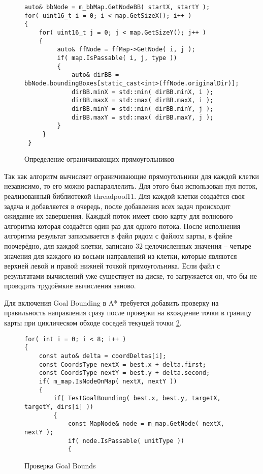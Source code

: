 \begin{figure}[!htb]
	\centering
	\captionsetup{justification=centering}
	\begin{lstlisting}
auto& bbNode = m_bbMap.GetNodeBB( startX, startY );
for( uint16_t i = 0; i < map.GetSizeX(); i++ )
{
	for( uint16_t j = 0; j < map.GetSizeY(); j++ )
	{
		 auto& ffNode = ffMap->GetNode( i, j ); 
		 if( map.IsPassable( i, j, type ))
		 {
			 auto& dirBB = bbNode.boundingBoxes[static_cast<int>(ffNode.originalDir)];	 
			 dirBB.minX = std::min( dirBB.minX, i );
			 dirBB.maxX = std::max( dirBB.maxX, i );
			 dirBB.minY = std::min( dirBB.minY, j );
			 dirBB.maxY = std::max( dirBB.maxY, j );
		 }
	 }
 }
	\end{lstlisting}
	\caption{Определение ограничивающих прямоугольников}
	\label{fig:goal_bounding_fill}
\end{figure}


Так как алгоритм вычисляет ограничивающие прямоугольники для каждой клетки независимо, то его можно распараллелить. Для этого был использован пул поток, реализованный библиотекой threadpool11. Для каждой клетки создаётся своя задача и добавляется в очередь, после добавления всех задач происходит ожидание их завершения. Каждый поток имеет свою карту для волнового алгоритма которая создаётся один раз для одного потока. После исполнения алгоритма результат записывается в файл рядом с файлом карты, в файле поочерёдно, для каждой клетки, записано 32 целочисленных значения -- четыре значения для каждого из восьми направлений из клетки, которые являются верхней левой и правой нижней точкой прямоугольника. Если файл с результатами вычислений уже существует на диске, то загружается он, что бы не проводить трудоёмкие вычисления заново.

Для включения Goal Bounding в A* требуется добавить проверку на правильность направления сразу после проверки на вхождение точки в границу карты при циклическом обходе соседей текущей точки \cref{fig:a_star_test_goal_bounds}. 

\begin{figure}[!htb]
	\centering
	\captionsetup{justification=centering}
	\begin{lstlisting}
for( int i = 0; i < 8; i++ )
{
	const auto& delta = coordDeltas[i];
	const CoordsType nextX = best.x + delta.first;
	const CoordsType nextY = best.y + delta.second;
	if( m_map.IsNodeOnMap( nextX, nextY ))
	{
		if( TestGoalBounding( best.x, best.y, targetX, targetY, dirs[i] ))
		{
			const MapNode& node = m_map.GetNode( nextX, nextY );
			if( node.IsPassable( unitType ))
			{
	\end{lstlisting}
	\caption{Проверка Goal Bounds}
	\label{fig:a_star_test_goal_bounds}
\end{figure}

